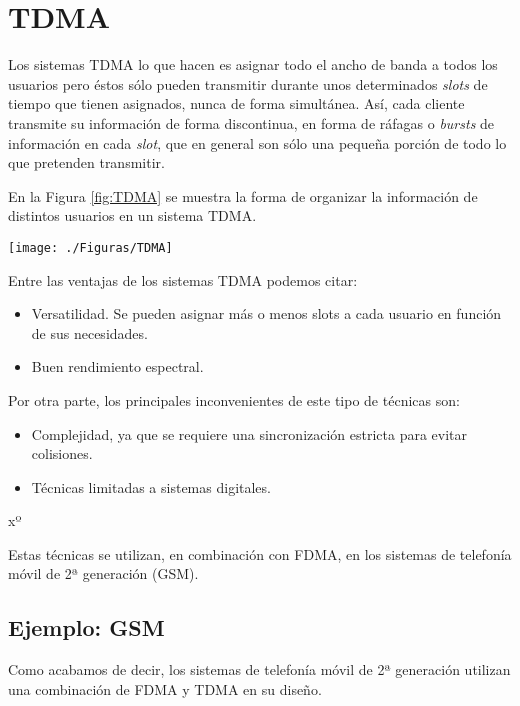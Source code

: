 \documentclass[es,apuntes]{uah}
\begin{document}
\section{TDMA}

Los sistemas TDMA lo que hacen es asignar todo el ancho de banda a todos los usuarios pero éstos sólo pueden transmitir durante unos determinados \emph{slots} de tiempo que tienen asignados, nunca de forma simultánea. Así, cada cliente transmite su información de forma discontinua, en forma de ráfagas o \emph{bursts} de información en cada \emph{slot}, que en general son sólo una pequeña porción de todo lo que pretenden transmitir. 

En la Figura \ref{fig:TDMA} se muestra la forma de organizar la información de distintos usuarios en un sistema TDMA. 

\begin{figure*}[h!]
	\centering\texttt{[image: ./Figuras/TDMA]}
	\caption{Sistema TDMA.}
	\label{fig:TDMA}
\end{figure*}


Entre las ventajas de los sistemas TDMA podemos citar:

\begin{itemize}
	\item Versatilidad. Se pueden asignar más o menos slots a cada usuario en función de sus necesidades. 
	\item Buen rendimiento espectral.
\end{itemize}

Por otra parte, los principales inconvenientes de este tipo de técnicas son:

\begin{itemize}
	\item Complejidad, ya que se requiere una sincronización estricta para evitar colisiones. 
	\item Técnicas limitadas a sistemas digitales.
\end{itemize}
xº

Estas técnicas se utilizan, en combinación con FDMA, en los sistemas de telefonía móvil de 2ª generación (GSM). 

\subsection{Ejemplo: GSM}

Como acabamos de decir, los sistemas de telefonía móvil de 2ª generación utilizan una combinación de FDMA y TDMA en su diseño. 
\end{document}
